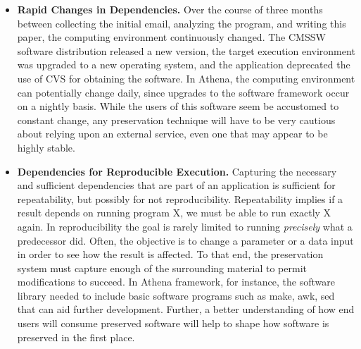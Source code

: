 \begin{itemize}
\item {\bf Rapid Changes in Dependencies.}  Over the course of three months
between collecting the initial email, analyzing the program, and writing this
paper, the computing environment continuously changed.  The CMSSW software
distribution released a new version, the target execution environment was upgraded
to a new operating system, and the application deprecated the use of CVS for obtaining
the software. In Athena, the computing environment can potentially change daily, since upgrades to the software framework occur on a nightly basis.  
While the users of this software seem be accustomed to constant change,
any preservation technique will have to be very cautious about relying upon an
external service, even one that may appear to be highly stable.

\item {\bf Dependencies for Reproducible Execution.} Capturing the necessary and sufficient dependencies that are part of an application is sufficient for repeatability, but possibly for not reproducibility.
Repeatability implies if a result depends on running program X, we must be able to run exactly X again. In reproducibility the goal is rarely limited to running
\emph{precisely} what a predecessor did. Often, the objective is to
change a parameter or a data input in order to see how the result is affected. To that end, the preservation system must capture enough of the surrounding
material to permit modifications to succeed. In Athena framework, for instance, the software library needed to include basic software programs such as make, awk, sed that can aid further development.  
Further, a better understanding of how end users will consume preserved software will help to shape how
software is preserved in the first place.
\end{itemize}


